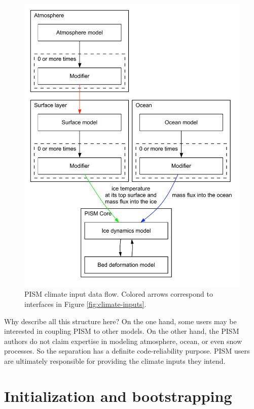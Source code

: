 \begin{figure}[ht]
  \centering
  \includegraphics[width=4.5in]{figs/data-flow.pdf}
  \caption{PISM climate input data flow. Colored arrows correspond to interfaces in
    Figure \ref{fig:climate-inputs}.}
  \label{fig:climate-input-data-flow}
\end{figure}

Why describe all this structure here?  On the one hand, some users may be interested
in coupling PISM to other models.  On the other hand, the PISM authors do not
claim expertise in modeling atmosphere, ocean, or even snow processes.  So the
separation has a definite code-reliability purpose.  PISM users
are ultimately responsible for providing the climate inputs they intend.

\clearpage
\newpage
\section{Initialization and bootstrapping}
\label{sec:boot}

